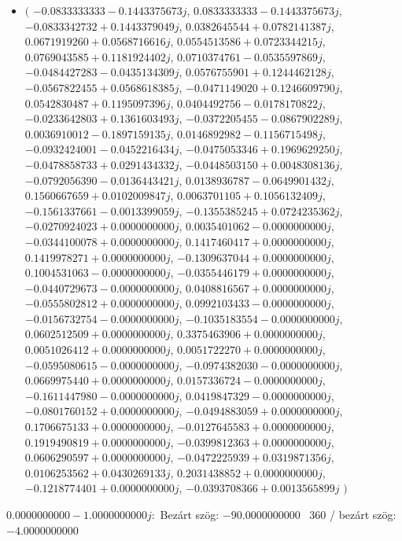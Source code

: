 \documentclass[14pt,a4paper]{article}
\begin{document}
\begin{itemize}
\item
$\big($
$-0.0833333333-0.1443375673j$, $0.0833333333-0.1443375673j$, $-0.0833342732+0.1443379049j$, $0.0382645544+0.0782141387j$, $0.0671919260+0.0568716616j$, $0.0554513586+0.0723344215j$, $0.0769043585+0.1181924402j$, $0.0710374761-0.0535597869j$, $-0.0484427283-0.0435134309j$, $0.0576755901+0.1244462128j$, $-0.0567822455+0.0568618385j$, $-0.0471149020+0.1246609790j$, $0.0542830487+0.1195097396j$, $0.0404492756-0.0178170822j$, $-0.0233642803+0.1361603493j$, $-0.0372205455-0.0867902289j$, $0.0036910012-0.1897159135j$, $0.0146892982-0.1156715498j$, $-0.0932424001-0.0452216434j$, $-0.0475053346+0.1969629250j$, $-0.0478858733+0.0291434332j$, $-0.0448503150+0.0048308136j$, $-0.0792056390-0.0136443421j$, $0.0138936787-0.0649901432j$, $0.1560667659+0.0102009847j$, $0.0063701105+0.1056132409j$, $-0.1561337661-0.0013399059j$, $-0.1355385245+0.0724235362j$, $-0.0270924023+0.0000000000j$, $0.0035401062-0.0000000000j$, $-0.0344100078+0.0000000000j$, $0.1417460417+0.0000000000j$, $0.1419978271+0.0000000000j$, $-0.1309637044+0.0000000000j$, $0.1004531063-0.0000000000j$, $-0.0355446179+0.0000000000j$, $-0.0440729673-0.0000000000j$, $0.0408816567+0.0000000000j$, $-0.0555802812+0.0000000000j$, $0.0992103433-0.0000000000j$, $-0.0156732754-0.0000000000j$, $-0.1035183554-0.0000000000j$, $0.0602512509+0.0000000000j$, $0.3375463906+0.0000000000j$, $0.0051026412+0.0000000000j$, $0.0051722270+0.0000000000j$, $-0.0595080615-0.0000000000j$, $-0.0974382030-0.0000000000j$, $0.0669975440+0.0000000000j$, $0.0157336724-0.0000000000j$, $-0.1611447980-0.0000000000j$, $0.0419847329-0.0000000000j$, $-0.0801760152+0.0000000000j$, $-0.0494883059+0.0000000000j$, $0.1706675133+0.0000000000j$, $-0.0127645583+0.0000000000j$, $0.1919490819+0.0000000000j$, $-0.0399812363+0.0000000000j$, $0.0606290597+0.0000000000j$, $-0.0472225939+0.0319871356j$, $0.0106253562+0.0430269133j$, $0.2031438852+0.0000000000j$, $-0.1218774401+0.0000000000j$, $-0.0393708366+0.0013565899j$
$\big)$
\end{itemize}
$0.0000000000-1.0000000000j$:\
Bezárt szög: $-90.0000000000$ \
360 / bezárt szög: $-4.0000000000$\
\end{document}
